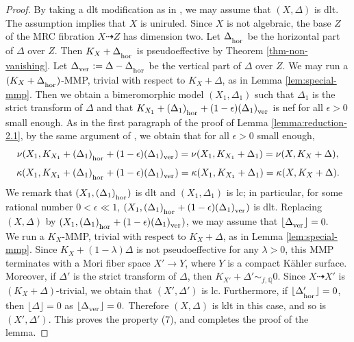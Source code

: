 \documentclass[12pt]{amsart}
\newcommand{\mbQ}{\mathbb{Q}}
\newcommand{\<}{\leq}
\newcommand{\bir}{\dashrightarrow}
\newcommand{\D}{\Delta}
\theoremstyle{remark}
\theoremstyle{definition}
\theoremstyle{definition}
\numberwithin{equation}{section}
\theoremstyle{definition}
\theoremstyle{definition}
\def\hor{\operatorname{\hor}}
\def\ver{\operatorname{\ver}}
\def\ver{\operatorname{\textsubscript{\rm ver}}}
\def\hor{\operatorname{\textsubscript{\rm hor}}}
\begin{document}
\begin{proof} 
By taking a dlt modification as in \cite[Theorem 5.2]{DasOu2022}, we may assume that $(X,\D)$ is dlt. 
The assumption implies that  $X$ is uniruled. 
Since $X$ is not algebraic, the base  $Z$ of the MRC fibration $X\bir Z$ has dimension two.
Let $\Delta_{\hor}$ be the horizontal part of $\Delta$ over $Z$. 
Then $K_X+\Delta_{\hor}$ is pseudoeffective by Theorem \ref{thm-non-vanishing}. 
Let $\Delta_{\ver}:=\Delta - \Delta_{\hor}$ be the vertical part of $\Delta$ over $Z$.
We may run a $(K_X+\Delta_{\hor})$-MMP, trivial with respect to $K_X+\Delta$, as in Lemma \ref{lem:special-mmp}. 
Then we obtain a  bimeromorphic model $(X_1,\Delta_1)$ such that $\D_1$ is the strict transform of $\D$ and that
$K_{X_1}+ (\Delta_1)_{\hor} + (1-\epsilon)(\Delta_1)_{\ver}$ is nef for all $\epsilon>0$ small enough. 
As in the first paragraph of the proof of Lemma \ref{lemma:reduction-2.1}, 
by the same argument of \cite[Lemma 11.3.3]{Kol92}, we obtain that  for all $\epsilon >0$ small enough, 
\[
\nu(X_1, K_{X_1}+ (\Delta_1)_{\hor} + (1-\epsilon)(\Delta_1)_{\ver}) = \nu(X_1, K_{X_1}+\Delta_1) = \nu(X, K_X+\Delta),
\]
\[\kappa(X_1, K_{X_1}+ (\Delta_1)_{\hor} + (1-\epsilon)(\Delta_1)_{\ver}) = \kappa(X_1, K_{X_1}+\Delta_1) = \kappa(X, K_X+\Delta).\]
We remark that $(X_1, (\Delta_1)_{\hor})$ is dlt and $(X_1,  \Delta_1)$  is lc; in particular, for some rational number $0<\epsilon\ll 1$,  $({X_1}, (\Delta_1)_{\hor} + (1-\epsilon)(\Delta_1)_{\ver})$ is dlt.
Replacing $(X,\Delta)$ by $(X_1, (\Delta_1)_{\hor} + (1-\epsilon)(\Delta_1)_{\ver})$, we may assume that 
$\lfloor \Delta_{\ver} \rfloor = 0.$     
\\


We run a $K_X$-MMP, trivial with respect to $K_X+\D$, as in Lemma \ref{lem:special-mmp}. 
Since $K_X+(1-\lambda)\D$ is not pseudoeffective for any $\lambda >0$, this MMP  terminates with  a Mori fiber space $X'\to Y$, where $Y$ is a compact K\"ahler surface. 
Moreover, if  $\D'$ is the strict transform of $\D$, then    $K_{X'}+\Delta'\sim_{f,\mbQ} 0$. 
Since $ X \dashrightarrow X'$ is  $(K_{{X}}+{\D})$-trivial, we obtain that $(X', \D')$ is lc. 
Furthermore,   if $\lfloor \Delta'_{\hor} \rfloor =0$, then $ \lfloor \Delta  \rfloor =0$ as  $\lfloor \Delta_{\ver} \rfloor = 0.$  
Therefore $(X,\D)$ is klt in this case, and so is $(X',\D')$. 
This proves the property (7), and completes the proof of the lemma. 
\end{proof}
\end{document}
